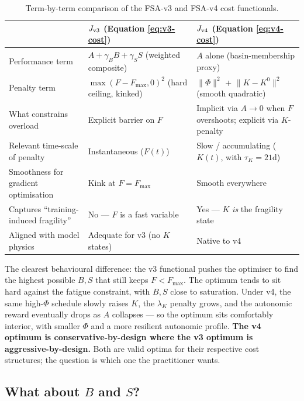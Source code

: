 \begin{table}[h]
\centering
\small
\begin{tabular}{p{3.4cm}p{4.6cm}p{4.6cm}}
\toprule
& \textbf{$J_{\rm v3}$ (Equation \ref{eq:v3-cost})} & \textbf{$J_{\rm v4}$ (Equation \ref{eq:v4-cost})} \\
\midrule
Performance term       & $A + \gamma_B B + \gamma_S S$ (weighted composite) & $A$ alone (basin-membership proxy) \\
Penalty term           & $\max(F - F_{\max}, 0)^2$ (hard ceiling, kinked) & $\|\Phi\|^2$ + $\|K - K^0\|^2$ (smooth quadratic) \\
What constrains overload & Explicit barrier on $F$ & Implicit via $A \to 0$ when $F$ overshoots; explicit via $K$-penalty \\
Relevant time-scale of penalty & Instantaneous ($F(t)$) & Slow / accumulating ($K(t)$, with $\tau_K = 21$d) \\
Smoothness for gradient optimisation & Kink at $F = F_{\max}$ & Smooth everywhere \\
Captures ``training-induced fragility'' & No --- $F$ is a fast variable & Yes --- $K$ \emph{is} the fragility state \\
Aligned with model physics & Adequate for v3 (no $K$ states) & Native to v4 \\
\bottomrule
\end{tabular}
\caption{Term-by-term comparison of the FSA-v3 and FSA-v4 cost functionals.}
\label{tab:cost_v3_vs_v4}
\end{table}

The clearest behavioural difference: the v3 functional pushes the optimiser to find the highest possible $B, S$ that still keeps $F < F_{\max}$. The optimum tends to sit hard against the fatigue constraint, with $B, S$ close to saturation. Under v4, the same high-$\Phi$ schedule slowly raises $K$, the $\lambda_K$ penalty grows, and the autonomic reward eventually drops as $A$ collapses --- so the optimum sits comfortably interior, with smaller $\Phi$ and a more resilient autonomic profile. \textbf{The v4 optimum is conservative-by-design where the v3 optimum is aggressive-by-design.} Both are valid optima for their respective cost structures; the question is which one the practitioner wants.

\subsection{What about $B$ and $S$?}

